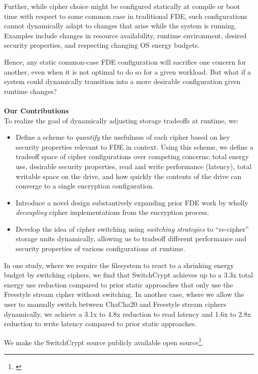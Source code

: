 Further, while cipher choice might be configured statically at compile or boot
time with respect to some common case in traditional FDE, such configurations
cannot dynamically adapt to changes that arise while the system is running.
Examples include changes in resource availability, runtime environment, desired
security properties, and respecting changing OS energy budgets.

Hence, any static common-case FDE configuration will sacrifice one concern for
another, even when it is not optimal to do so for a given workload. But what if
a system could dynamically transition into a more desirable configuration given
runtime changes?\\
\\
\textbf{Our Contributions}\\
To realize the goal of dynamically adjusting storage tradeoffs at runtime, we:

\begin{itemize}
  \item Define a scheme to \emph{quantify} the usefulness of each cipher based
  on key security properties relevant to FDE in context. Using this scheme, we
  define a tradeoff space of cipher configurations over competing concerns:
  total energy use, desirable security properties, read and write performance
  (latency), total writable space on the drive, and how quickly the contents of
  the drive can converge to a single encryption configuration.

  \item Introduce a novel design substantively expanding prior FDE work by
  wholly \emph{decoupling} cipher implementations from the encryption process.

  \item Develop the idea of cipher switching using \emph{switching strategies}
  to ``re-cipher'' storage units dynamically, allowing us to tradeoff different
  performance and security properties of various configurations at runtime.
\end{itemize}


In one study, where we require the filesystem to react to a shrinking energy
budget by switching ciphers, we find that SwitchCrypt achieves up to a 3.3x
total energy use reduction compared to prior static approaches that only use the
Freestyle stream cipher without switching. In another case, where we allow the
user to manually switch between ChaCha20 and Freestyle stream ciphers
dynamically, we achieve a 3.1x to 4.8x reduction to read latency and 1.6x to
2.8x reduction to write latency compared to prior static approaches.

We make the SwitchCrypt source publicly available open
source\footnote{\label{note1}\SystemURI}.
